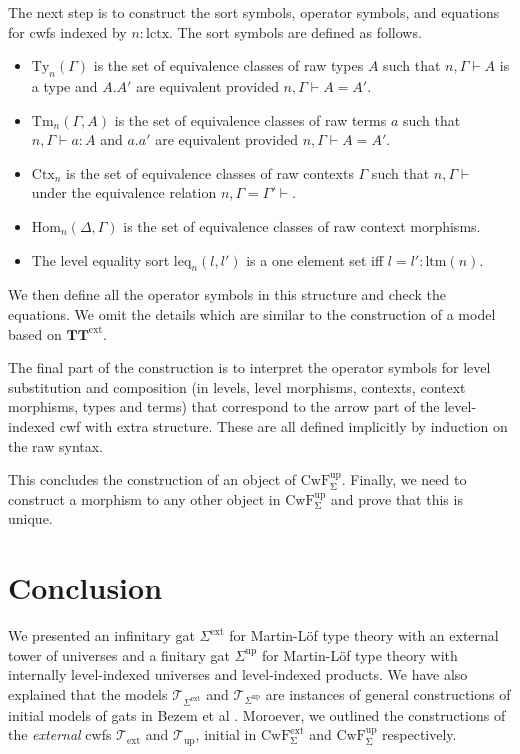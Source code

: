 \documentclass[11pt,a4paper]{article}
\theoremstyle{plain}
\theoremstyle{definition}
\newcommand{\Ctx}{\mathrm{Ctx}}
\newcommand{\Sub}{\mathrm{Hom}}
\newcommand{\Ty}{\mathrm{Ty}}
\newcommand{\Tm}{\mathrm{Tm}}
\newcommand{\T}{\mathsf{T}}
\def\lctx{\mathrm{lctx}}
\def\ltm{\mathrm{ltm}}
\def\leq{\mathrm{leq}}
\def\T{\mathcal{T}}
\def\CwFext{\mathrm{CwF^{ext}_\Sigma}}
\def\CwFint{\mathrm{CwF^{up}_\Sigma}}
\def\Sigmaext{{\Sigma^\mathrm{ext}}}
\def\Sigmaint{{\Sigma^\mathrm{up}}}
\def\TText{{\mathbf{TT}^\mathrm{ext}}}
\def\Text{\T_\mathrm{ext}}
\def\Tint{\T_\mathrm{up}}
\begin{document}
The next step is to construct the sort symbols, operator symbols, and equations for cwfs indexed by $n : \lctx$. The sort symbols are defined as follows.
\begin{itemize}
\item $\Ty_n(\Gamma)$ is the set of equivalence classes of raw types $A$ such that $n, \Gamma \vdash A$ is a type and $A.A'$ are equivalent provided $n, \Gamma \vdash A = A'$.
\item $\Tm_n(\Gamma,A)$ is the set of equivalence classes of raw terms $a$ such that $n, \Gamma \vdash a : A$ and $a.a'$ are equivalent provided $n, \Gamma \vdash A = A'$.
\item $\Ctx_n$ is the set of equivalence classes of raw contexts $\Gamma$ such that $n, \Gamma \vdash$ under the equivalence relation $n, \Gamma = \Gamma' \vdash$.
\item $\Sub_n(\Delta,\Gamma)$ is the set of equivalence classes of raw context morphisms.
\item The level equality sort $\leq_n(l,l')$ is a one element set iff $l = l' : \ltm(n)$.
\end{itemize}
We then define all the operator symbols in this structure and check the equations. We omit the details which are similar to the construction of a model based on $\TText$.

The final part of the construction is to interpret the operator symbols for level substitution and composition (in levels, level morphisms, contexts, context morphisms, types and terms) that correspond to the arrow part of the level-indexed cwf with extra structure. These are all defined implicitly by induction on the raw syntax.

This concludes the construction of an object of $\CwFint$. Finally, we need to construct a morphism to any other object in $\CwFint$ and prove that this is unique.


\section{Conclusion}

We presented an infinitary gat $\Sigmaext$ for Martin-Löf type theory with an external tower of universes and a finitary gat $\Sigmaint$ for Martin-Löf type theory with internally level-indexed universes and level-indexed products. We have also explained that the models $\T_{\Sigmaext}$ and $\T_{\Sigmaint}$ are instances of general constructions of initial models of gats in
Bezem et al \cite{bezem:hofmann}. Moroever, we outlined the constructions of the {\em external} cwfs $\Text$ and $\Tint$, initial in $\CwFext$ and $\CwFint$ respectively.
\end{document}

